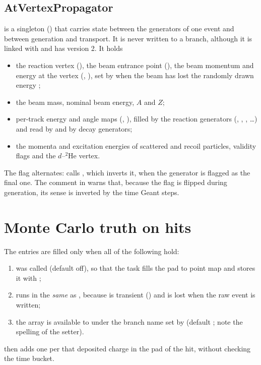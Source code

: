 \subsection{AtVertexPropagator}

 is a singleton () that carries state
between the generators of one event and between generation and transport. It is never written to a
branch, although it is linked with \code{+} and has  version 2. It holds
\begin{itemize}
\item the reaction vertex (), the beam entrance point (), the beam
  momentum and energy at the vertex (, ), set by
   when the beam has lost the randomly drawn energy
  ;
\item the beam mass, nominal beam energy, $A$ and $Z$;
\item per-track energy and angle maps (, ),
  filled by the reaction generators (, , ,
  \ldots) and read by  and by decay generators;
\item the momenta and excitation energies of scattered and recoil particles, validity flags and the
  $d$--$^2$He vertex.
\end{itemize}
The flag  alternates:  calls ,
which inverts it, when the generator is flagged as the final one. The comment in  warns
that, because the flag is flipped during generation, its sense is inverted by the time Geant steps.

\section{Monte Carlo truth on hits}
\label{sec:dm-mctruth}

The  entries are filled only when all of the following hold:
\begin{enumerate}
\item {} was called (default off), so that the task fills the pad to
  point map and stores it with ;
\item {} runs in the \emph{same}  as , because
   is transient (\code{//!}) and is lost when the raw event is written;
\item the  array is available to  under the branch name set by
   (default ; note the spelling of the setter).
\end{enumerate}
 then adds one  per  that deposited charge
in the pad of the hit, without checking the time bucket.

